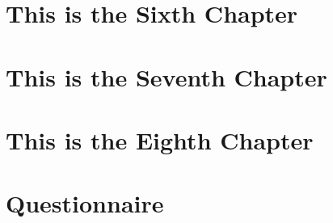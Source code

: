 \documentclass[12pt]{cwru_thesis}
\begin{document}
\chapter{This is the Sixth Chapter}
\chapter{This is the Seventh Chapter}
\chapter{This is the Eighth Chapter}


\appendix

\chapter{Questionnaire}

\printbibliography[heading=bibintoc]
\end{document}
